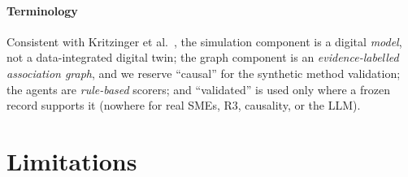 \documentclass[conference]{IEEEtran}
\begin{document}
\paragraph{Terminology}
Consistent with Kritzinger et al.~\cite{Kritzinger2018}, the simulation
component is a digital \emph{model}, not a data-integrated digital twin; the
graph component is an \emph{evidence-labelled association graph}, and we reserve
``causal'' for the synthetic method validation; the agents are \emph{rule-based}
scorers; and ``validated'' is used only where a frozen record supports it
(nowhere for real SMEs, R3, causality, or the LLM).

\section{Limitations}
\label{sec:limitations}
\end{document}
